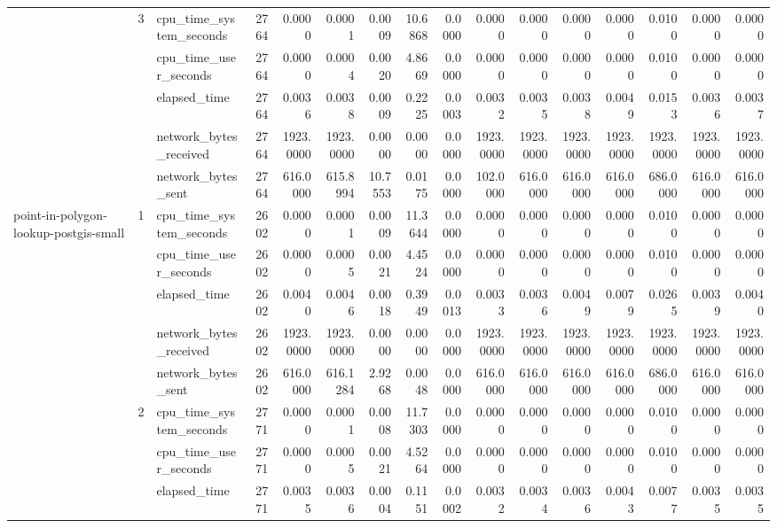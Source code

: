 \begin{tabular}{lllrrrrrrrrrrrrr}
\cline{2-16}
 & \multirow[t]{5}{*}{3} & cpu\_time\_system\_seconds & 2764 & 0.0000 & 0.0001 & 0.0009 & 10.6868 & 0.0000 & 0.0000 & 0.0000 & 0.0000 & 0.0000 & 0.0100 & 0.0000 & 0.0000 \\
 &  & cpu\_time\_user\_seconds & 2764 & 0.0000 & 0.0004 & 0.0020 & 4.8669 & 0.0000 & 0.0000 & 0.0000 & 0.0000 & 0.0000 & 0.0100 & 0.0000 & 0.0000 \\
 &  & elapsed\_time & 2764 & 0.0036 & 0.0038 & 0.0009 & 0.2225 & 0.0003 & 0.0032 & 0.0035 & 0.0038 & 0.0049 & 0.0153 & 0.0036 & 0.0037 \\
 &  & network\_bytes\_received & 2764 & 1923.0000 & 1923.0000 & 0.0000 & 0.0000 & 0.0000 & 1923.0000 & 1923.0000 & 1923.0000 & 1923.0000 & 1923.0000 & 1923.0000 & 1923.0000 \\
 &  & network\_bytes\_sent & 2764 & 616.0000 & 615.8994 & 10.7553 & 0.0175 & 0.0000 & 102.0000 & 616.0000 & 616.0000 & 616.0000 & 686.0000 & 616.0000 & 616.0000 \\
\cline{1-16} \cline{2-16}
\multirow[t]{15}{*}{point-in-polygon-lookup-postgis-small} & \multirow[t]{5}{*}{1} & cpu\_time\_system\_seconds & 2602 & 0.0000 & 0.0001 & 0.0009 & 11.3644 & 0.0000 & 0.0000 & 0.0000 & 0.0000 & 0.0000 & 0.0100 & 0.0000 & 0.0000 \\
 &  & cpu\_time\_user\_seconds & 2602 & 0.0000 & 0.0005 & 0.0021 & 4.4524 & 0.0000 & 0.0000 & 0.0000 & 0.0000 & 0.0000 & 0.0100 & 0.0000 & 0.0000 \\
 &  & elapsed\_time & 2602 & 0.0040 & 0.0046 & 0.0018 & 0.3949 & 0.0013 & 0.0033 & 0.0036 & 0.0049 & 0.0079 & 0.0265 & 0.0039 & 0.0040 \\
 &  & network\_bytes\_received & 2602 & 1923.0000 & 1923.0000 & 0.0000 & 0.0000 & 0.0000 & 1923.0000 & 1923.0000 & 1923.0000 & 1923.0000 & 1923.0000 & 1923.0000 & 1923.0000 \\
 &  & network\_bytes\_sent & 2602 & 616.0000 & 616.1284 & 2.9268 & 0.0048 & 0.0000 & 616.0000 & 616.0000 & 616.0000 & 616.0000 & 686.0000 & 616.0000 & 616.0000 \\
\cline{2-16}
 & \multirow[t]{5}{*}{2} & cpu\_time\_system\_seconds & 2771 & 0.0000 & 0.0001 & 0.0008 & 11.7303 & 0.0000 & 0.0000 & 0.0000 & 0.0000 & 0.0000 & 0.0100 & 0.0000 & 0.0000 \\
 &  & cpu\_time\_user\_seconds & 2771 & 0.0000 & 0.0005 & 0.0021 & 4.5264 & 0.0000 & 0.0000 & 0.0000 & 0.0000 & 0.0000 & 0.0100 & 0.0000 & 0.0000 \\
 &  & elapsed\_time & 2771 & 0.0035 & 0.0036 & 0.0004 & 0.1151 & 0.0002 & 0.0032 & 0.0034 & 0.0036 & 0.0043 & 0.0077 & 0.0035 & 0.0035 \\

\end{tabular}
